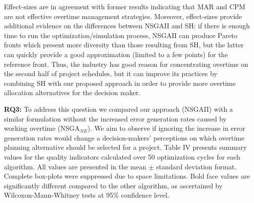 \documentclass[conference]{IEEEtran}
\begin{document}
Effect-sizes are in agreement with former results indicating that MAR and CPM are not effective overtime management strategies. Moreover, effect-sizes provide additional evidence on the differences between NSGAII and SH: if there is enough time to run the optimization/simulation process, NSGAII can produce Pareto fronts which present more diversity than those resulting from SH, but the latter can quickly provide a good approximation (limited to a few points) for the reference front. Thus, the industry has good reason for concentrating overtime on the second half of project schedules, but it can improve its practices by combining SH with our proposed approach in order to provide more overtime allocation alternatives for the decision maker.

\noindent
\textbf{RQ3:} To address this question we compared our approach (NSGAII) with a similar formulation without the increased error generation rates caused by working overtime (NSGA$_{NE}$). We aim to observe if ignoring the increase in error generation rates would change a decision-makers' perceptions on which overtime planning alternative should be selected for a project. Table IV presents summary values for the quality indicators calculated over 50 optimization cycles for each algorithm. All values are presented in the mean $\pm$ standard deviation format. Complete box-plots were suppressed due to space limitations. Bold face values are significantly different compared to the other algorithm, as ascertained by Wilcoxon-Mann-Whitney tests at 95\% confidence level. 
\end{document}

